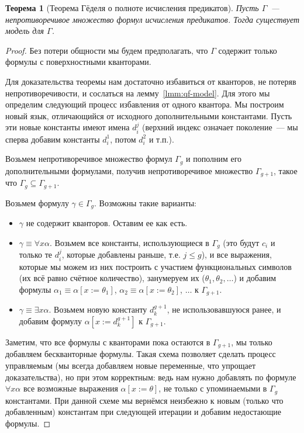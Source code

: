 \documentclass[a4paper,11pt]{article}
\newtheorem{thm}{Теорема}[section]
\theoremstyle{definition}
\begin{document}
\begin{thm}[Теорема Гёделя о полноте исчисления предикатов]\label{thm:godel-complete}
Пусть $\Gamma$~--- непротиворечивое множество формул исчисления предикатов.
Тогда существует модель для $\Gamma$.
\end{thm}
\begin{proof}
Без потери общности мы будем предполагать, что $\Gamma$ содержит только формулы
с поверхностными кванторами.

Для доказательства теоремы нам достаточно избавиться от кванторов, не потеряв
непротиворечивости, и сослаться на лемму~\ref{lmm:qf-model}. Для этого мы
определим следующий процесс избавления от одного квантора. Мы построим новый
язык, отличающийся от исходного дополнительными константами. Пусть эти новые
константы имеют имена $d^j_i$ (верхний индекс означает поколение~--- мы сперва
добавим константы $d^1_i$, потом $d^2_i$ и т.п.).

Возьмем непротиворечивое множество формул $\Gamma_g$ и пополним его
дополнительными формулами, получив непротиворечивое множество $\Gamma_{g+1}$,
такое что $\Gamma_g \subseteq \Gamma_{g+1}$.

Возьмем формулу $\gamma \in \Gamma_g$. Возможны такие варианты:
\begin{itemize}
\item $\gamma$ не содержит кванторов. Оставим ее как есть.
\item $\gamma \equiv \forall x\alpha$. Возьмем все константы, использующиеся в
  $\Gamma_g$ (это будут $c_i$ и только те $d^j_i$, которые добавлены раньше,
  т.е. $j \le g$), и все выражения, которые мы можем из них построить с
  участием функциональных символов (их всё равно счётное количество),
  занумеруем их ($\theta_1, \theta_2, \dots$) и добавим формулы $\alpha_1 \equiv
  \alpha[x := \theta_1]$, $\alpha_2 \equiv \alpha[x := \theta_2]$, $\dots$ к
  $\Gamma_{g+1}$.
\item $\gamma \equiv \exists x\alpha$. Возьмем новую константу $d^{g+1}_k$, не
  использовавшуюся ранее, и добавим формулу $\alpha[x := d^{g+1}_k]$ к
  $\Gamma_{g+1}$.
\end{itemize}

Заметим, что все формулы с кванторами пока остаются в $\Gamma_{g+1}$, мы только
добавляем бескванторные формулы. Такая схема позволяет сделать процесс
управляемым (мы всегда добавляем новые переменные, что упрощает доказательства),
но при этом корректным: ведь нам нужно добавлять по формуле $\forall x\alpha$
все возможные выражения $\alpha[x := \theta]$, не только с упоминаемыми в
$\Gamma_g$ константами. При данной схеме мы вернёмся неизбежно к новым (только
что добавленным) константам при следующей итерации и добавим недостающие
формулы.


\end{proof}
\end{document}
